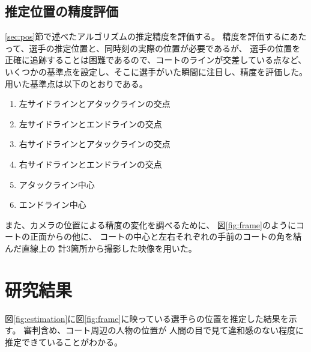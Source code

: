 \documentclass[twoside,twocolumn]{jsarticle}
\begin{document}
	\subsection{推定位置の精度評価}
        \ref{sec:pos}節で述べたアルゴリズムの推定精度を評価する。
        精度を評価するにあたって、選手の推定位置と、同時刻の実際の位置が必要であるが、
        選手の位置を正確に追跡することは困難であるので、コートのラインが交差している点など、
        いくつかの基準点を設定し、そこに選手がいた瞬間に注目し、精度を評価した。
        用いた基準点は以下のとおりである。

        \begin{enumerate}
            \item 左サイドラインとアタックラインの交点
            \item 左サイドラインとエンドラインの交点
            \item 右サイドラインとアタックラインの交点
            \item 右サイドラインとエンドラインの交点
            \item アタックライン中心
            \item エンドライン中心
        \end{enumerate}
        
        また、カメラの位置による精度の変化を調べるために、
        図\ref{fig:frame}のようにコートの正面からの他に、
        コートの中心と左右それぞれの手前のコートの角を結んだ直線上の
        計3箇所から撮影した映像を用いた。


\section{研究結果}
    図\ref{fig:estimation}に図\ref{fig:frame}に映っている選手らの位置を推定した結果を示す。
    審判含め、コート周辺の人物の位置が
    人間の目で見て違和感のない程度に推定できていることがわかる。
\end{document}
